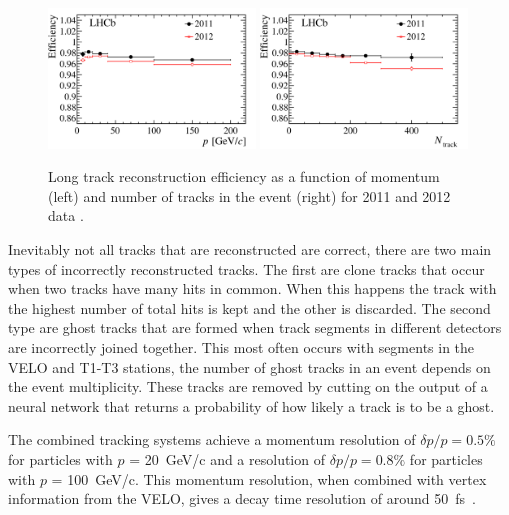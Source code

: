 \begin{figure}[tb] 
  \centering    
  \includegraphics[width=0.49\textwidth]{./Figs/LHC_LHCb/hidef_Fig16topleft.png}
  \includegraphics[width=0.49\textwidth]{./Figs/LHC_LHCb/hidef_Fig16bottomleft.png}
  \caption{Long track reconstruction efficiency as a function of momentum (left) and number of tracks in the event (right) for 2011 and 2012 data \cite{Aaij:2014pwa}.}
  \label{fig:types_of_tracks}
\end{figure}




Inevitably not all tracks that are reconstructed are correct, there are two main types of incorrectly reconstructed tracks. The first are clone tracks that occur when two tracks have many hits in common. When this happens the track with the highest number of total hits is kept and the other is discarded. The second type are ghost tracks that are formed when track segments in different detectors are incorrectly joined together. This most often occurs with segments in the VELO and T1-T3 stations, the number of ghost tracks in an event depends on the event multiplicity. These tracks are removed by cutting on the output of a neural network that returns a probability of how likely a track is to be a ghost. %



The combined tracking systems achieve a momentum resolution of $\delta p / p = 0.5\%$ for particles with $p$ =  20~GeV/c and a resolution of $\delta p / p = 0.8\%$ for particles with $p$ =  100~GeV/c.  This momentum resolution, when combined with vertex information from the VELO, gives a decay time resolution of around 50~fs~\cite{Aaij:2014jba}. 



